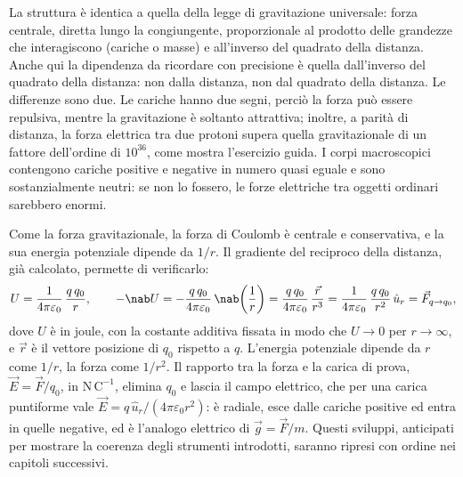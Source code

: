 \documentclass[main.tex]{subfiles}
\begin{document}
La struttura è identica a quella della legge di gravitazione universale: forza centrale, diretta lungo la congiungente, proporzionale al prodotto delle grandezze che interagiscono (cariche o masse) e all'inverso del quadrato della distanza. Anche qui la dipendenza da ricordare con precisione è quella dall'inverso del quadrato della distanza: non dalla distanza, non dal quadrato della distanza. Le differenze sono due. Le cariche hanno due segni, perciò la forza può essere repulsiva, mentre la gravitazione è soltanto attrattiva; inoltre, a parità di distanza, la forza elettrica tra due protoni supera quella gravitazionale di un fattore dell'ordine di $10^{36}$, come mostra l'esercizio guida. I corpi macroscopici contengono cariche positive e negative in numero quasi eguale e sono sostanzialmente neutri: se non lo fossero, le forze elettriche tra oggetti ordinari sarebbero enormi.

Come la forza gravitazionale, la forza di Coulomb è centrale e conservativa, e la sua energia potenziale dipende da $1/r$. Il gradiente del reciproco della distanza, già calcolato, permette di verificarlo:
\[
U=\frac{1}{4\pi\varepsilon_0}\,\frac{q\,q_0}{r},\qquad
-\nab U=-\frac{q\,q_0}{4\pi\varepsilon_0}\,\nab\!\left(\frac1r\right)=\frac{q\,q_0}{4\pi\varepsilon_0}\,\frac{\vec r}{r^3}=\frac{1}{4\pi\varepsilon_0}\,\frac{q\,q_0}{r^2}\,\hat u_r=\vec F_{q\to q_0} ,
\]
dove $U$ è in joule, con la costante additiva fissata in modo che $U\to0$ per $r\to\infty$, e $\vec r$ è il vettore posizione di $q_0$ rispetto a $q$. L'energia potenziale dipende da $r$ come $1/r$, la forza come $1/r^2$. Il rapporto tra la forza e la carica di prova, $\vec E=\vec F/q_0$, in $\mathrm{N\,C^{-1}}$, elimina $q_0$ e lascia il campo elettrico, che per una carica puntiforme vale $\vec E=q\,\hat u_r/(4\pi\varepsilon_0r^2)$: è radiale, esce dalle cariche positive ed entra in quelle negative, ed è l'analogo elettrico di $\vec g=\vec F/m$. Questi sviluppi, anticipati per mostrare la coerenza degli strumenti introdotti, saranno ripresi con ordine nei capitoli successivi.
\end{document}
